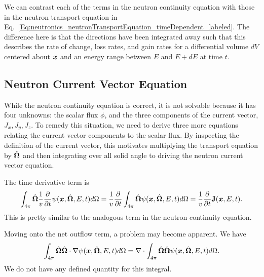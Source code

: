 We can contrast each of the terms in the neutron continuity equation with those in the neutron transport equation in Eq.~\eqref{Eq:neutronics_neutronTransportEquation_timeDependent_labeled}. The difference here is that the directions have been integrated away such that this describes the rate of change, loss rates, and gain rates for a differential volume $dV$ centered about $\bm{x}$ and an energy range between $E$ and $E + dE$ at time $t$.

\subsection{Neutron Current Vector Equation}

While the neutron continuity equation is correct, it is not solvable because it has four unknowns: the scalar flux $\phi$, and the three components of the current vector, $J_x, J_y, J_z$. To remedy this situation, we need to derive three more equations relating the current vector components to the scalar flux. By inspecting the definition of the current vector, this motivates multiplying the transport equation by $\hat{\mathbf{\Omega}}$ and then integrating over all solid angle to driving the neutron current vector equation.

The time derivative term is 
\begin{align}
  \int_{4\pi} \hat{\mathbf{\Omega}} \frac{1}{v} \frac{ \partial {} }{ \partial {t} } \psi(\bm{x},\hat{\mathbf{\Omega}},E,t) d\Omega = \frac{1}{v} \frac{ \partial {} }{ \partial {t} } \int_{4\pi} \hat{\mathbf{\Omega}} \psi(\bm{x},\hat{\mathbf{\Omega}},E,t) d\Omega = \frac{1}{v} \frac{ \partial {} }{ \partial {t} } \mathbf{J}(\bm{x},E,t) . \nonumber
\end{align}
This is pretty similar to the analogous term in the neutron continuity equation. 

Moving onto the net outflow term, a problem may become apparent. We have
\begin{align}
  \int_{4\pi} \hat{\mathbf{\Omega}} \hat{\mathbf{\Omega}} \cdot \nabla \psi(\bm{x},\hat{\mathbf{\Omega}},E,t) d\Omega = \nabla \cdot  \int_{4\pi} \hat{\mathbf{\Omega}} \hat{\mathbf{\Omega}} \psi(\bm{x},\hat{\mathbf{\Omega}},E,t) d\Omega . \nonumber
\end{align}
We do not have any defined quantity for this integral. 

